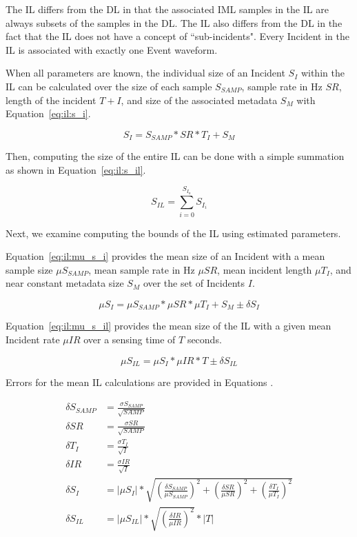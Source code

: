 The IL differs from the DL in that the associated IML samples in the IL are always subsets of the samples in the DL\@. The IL also differs from the DL in the fact that the IL does not have a concept of ``sub-incidents". Every Incident in the IL is associated with exactly one Event waveform.

When all parameters are known, the individual size of an Incident $S_{I}$ within the IL can be calculated over the size of each sample $S_{SAMP}$, sample rate in Hz $SR$, length of the incident $T+{I}$, and size of the associated metadata $S_{M}$ with Equation~\ref{eq:il:s_i}.

\begin{equation}\label{eq:il:s_i}
	S_{I} = S_{SAMP} * SR * T_{I} + S_{M}
\end{equation}

Then, computing the size of the entire IL can be done with a simple summation as shown in Equation~\ref{eq:il:s_il}.

\begin{equation}\label{eq:il:s_il}
	S_{IL} = \sum_{i=0}^{S_{I_{n}}} S_{I_{i}}
\end{equation}

Next, we examine computing the bounds of the IL using estimated parameters.

Equation~\ref{eq:il:mu_s_i} provides the mean size of an Incident with a mean sample size $\mu S_{SAMP}$, mean sample rate in Hz $\mu SR$, mean incident length $\mu T_{I}$, and near constant metadata size $S_{M}$ over the set of Incidents $I$.

\begin{equation}\label{eq:il:mu_s_i}
	\mu S_{I} = \mu S_{SAMP} * \mu SR * \mu T_{I} + S_{M} \pm \delta S_{I}
\end{equation}

Equation~\ref{eq:il:mu_s_il} provides the mean size of the IL with a given mean Incident rate $\mu IR$ over a sensing time of $T$ seconds.

\begin{equation}\label{eq:il:mu_s_il}
	\mu S_{IL} = \mu S_{I} * \mu IR * T \pm \delta S_{IL}
\end{equation}

Errors for the mean IL calculations are provided in Equations .

\begin{align}
	\delta S_{SAMP} &= \frac{\sigma S_{SAMP}}{\sqrt{SAMP}} \label{eq:il0} \\
	\delta SR &= \frac{\sigma SR}{\sqrt{SAMP}} \label{eq:il1} \\
	\delta T_{I} &= \frac{\sigma T_{I}}{\sqrt{I}} \label{eq:il2} \\
	\delta IR &= \frac{\sigma IR}{\sqrt{I}} \label{eq:il3} \\
	\delta S_{I} &= |\mu S_{I}| * \sqrt{(\frac{\delta S_{SAMP}}{\mu S_{SAMP}})^2 + (\frac{\delta SR}{\mu SR})^2 + (\frac{\delta T_{I}}{\mu T_{I}})^2} \label{eq:il4} \\
	\delta S_{IL} &= |\mu S_{IL}| * \sqrt{(\frac{\delta IR}{\mu IR})^2} * |T| \label{eq:il5}
\end{align}

